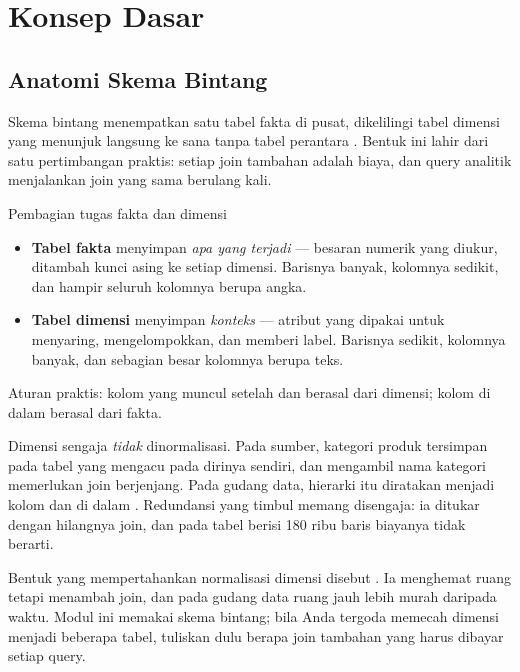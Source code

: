 \section{Konsep Dasar}

\subsection{Anatomi Skema Bintang}

Skema bintang menempatkan satu tabel fakta di pusat, dikelilingi tabel dimensi
yang menunjuk langsung ke sana tanpa tabel perantara \citep{kimball2013}. Bentuk
ini lahir dari satu pertimbangan praktis: setiap join tambahan adalah biaya, dan
query analitik menjalankan join yang sama berulang kali.

\begin{konsep}{Pembagian tugas fakta dan dimensi}
\begin{itemize}
  \item \textbf{Tabel fakta} menyimpan \emph{apa yang terjadi} --- besaran
        numerik yang diukur, ditambah kunci asing ke setiap dimensi. Barisnya
        banyak, kolomnya sedikit, dan hampir seluruh kolomnya berupa angka.
  \item \textbf{Tabel dimensi} menyimpan \emph{konteks} --- atribut yang dipakai
        untuk menyaring, mengelompokkan, dan memberi label. Barisnya sedikit,
        kolomnya banyak, dan sebagian besar kolomnya berupa teks.
\end{itemize}
Aturan praktis: kolom yang muncul setelah  dan
 berasal dari dimensi; kolom di dalam  berasal
dari fakta.
\end{konsep}

Dimensi sengaja \emph{tidak} dinormalisasi. Pada sumber, kategori produk
tersimpan pada tabel  yang mengacu pada dirinya sendiri, dan
mengambil nama kategori memerlukan join berjenjang. Pada gudang data, hierarki
itu diratakan menjadi kolom  dan  di
dalam . Redundansi yang timbul memang disengaja: ia
ditukar dengan hilangnya join, dan pada tabel berisi 180 ribu baris biayanya
tidak berarti.

\begin{catatan}
Bentuk yang mempertahankan normalisasi dimensi disebut .
Ia menghemat ruang tetapi menambah join, dan pada gudang data ruang jauh lebih
murah daripada waktu. Modul ini memakai skema bintang; bila Anda tergoda
memecah dimensi menjadi beberapa tabel, tuliskan dulu berapa join tambahan yang
harus dibayar setiap query.
\end{catatan}

